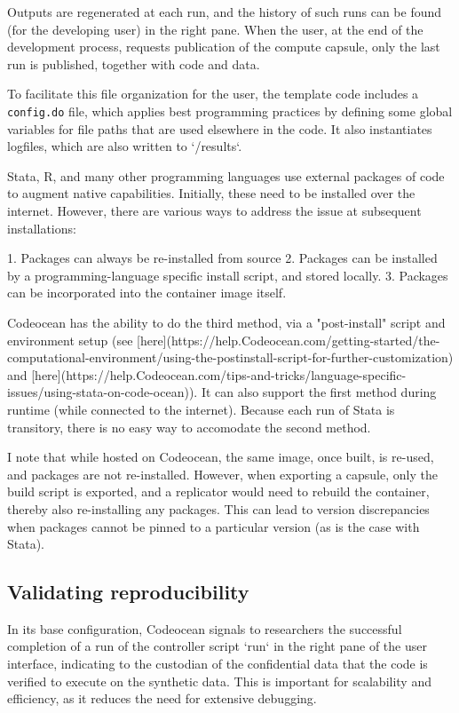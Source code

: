\documentclass[]{hdsr}
\begin{document}
Outputs are regenerated at each run, and the history of such runs can be found (for the developing user) in the right pane. When the user, at the end of the development process, requests publication of the compute capsule, only the last run is published, together with code and data.

To facilitate this file organization for the user, the template code includes a \texttt{config.do} file, which applies best programming practices by defining some global variables for file paths that are used elsewhere in the code. It also instantiates logfiles, which are also written to `/results`.



Stata, R, and many other programming languages use external packages of code to augment native capabilities. Initially, these need to be installed over the internet. However, there are various ways to address the issue at subsequent installations:

1. Packages can always be re-installed from source
2. Packages can be installed by a programming-language specific install script, and stored locally. 
3. Packages can be incorporated into the container image itself.

Codeocean has the ability to do the third method, via a "post-install" script and environment setup (see [here](https://help.Codeocean.com/getting-started/the-computational-environment/using-the-postinstall-script-for-further-customization) and [here](https://help.Codeocean.com/tips-and-tricks/language-specific-issues/using-stata-on-code-ocean)). It can also support the first method during runtime (while connected to the internet). Because each run of Stata is transitory, there is no easy way to accomodate the second method. 

I note that while hosted on Codeocean, the same image, once built, is re-used, and packages are not re-installed. However, when exporting a capsule, only the build script is exported, and a replicator would need to rebuild the container, thereby also re-installing any packages. This can lead to version discrepancies when packages cannot be pinned to a particular version (as is the case with Stata). 

\subsection{Validating reproducibility}

In its base configuration, Codeocean signals to researchers the successful completion of a run of the controller script `run` in the right pane of the user interface, indicating to the custodian of the confidential data that the code is verified to execute on the synthetic data. This is important for scalability and efficiency, as it reduces the need for extensive debugging.
\end{document}
